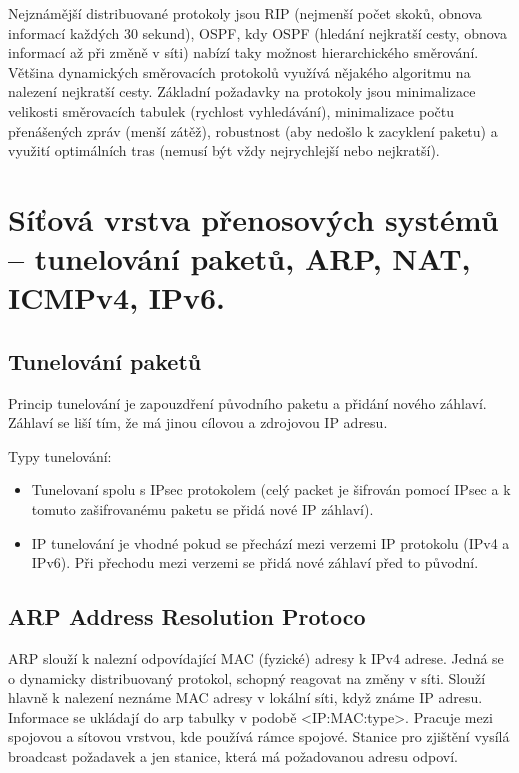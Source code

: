 Nejznámější distribuované protokoly jsou RIP (nejmenší počet skoků, obnova informací každých 30 sekund), OSPF, kdy OSPF (hledání nejkratší cesty, obnova informací až při změně v síti) nabízí taky možnost hierarchického směrování. Většina dynamických směrovacích protokolů využívá nějakého algoritmu na nalezení nejkratší cesty. Základní požadavky na protokoly jsou minimalizace velikosti směrovacích tabulek (rychlost vyhledávání), minimalizace počtu přenášených zpráv (menší zátěž), robustnost (aby nedošlo k zacyklení paketu) a využití optimálních tras (nemusí být vždy nejrychlejší nebo nejkratší).

\clearpage
\section{Síťová vrstva přenosových systémů -- tunelování paketů, ARP, NAT, ICMPv4, IPv6.}

\subsection{Tunelování paketů}

Princip tunelování je zapouzdření původního paketu a přidání nového záhlaví. Záhlaví se liší tím, že má jinou cílovou a zdrojovou IP adresu.

Typy tunelování:
\begin{itemize}[noitemsep]
    \item Tunelovaní spolu s IPsec protokolem (celý packet je šifrován pomocí IPsec a k tomuto zašifrovanému paketu se přidá nové IP záhlaví).
    \item IP tunelování je vhodné pokud se přechází mezi verzemi IP protokolu (IPv4 a IPv6). Při přechodu mezi verzemi se přidá nové záhlaví před to původní.
\end{itemize}

\subsection{ARP Address Resolution Protoco}

ARP slouží k nalezní odpovídající MAC (fyzické) adresy k IPv4 adrese. Jedná se o dynamicky distribuovaný protokol, schopný reagovat na změny v síti. Slouží hlavně k nalezení neznáme MAC adresy v lokální síti, když známe IP adresu. Informace se ukládají do arp tabulky v podobě <IP:MAC:type>. Pracuje mezi spojovou a sítovou vrstvou, kde používá rámce spojové. Stanice pro zjištění vysílá broadcast požadavek a jen stanice, která má požadovanou adresu odpoví.


